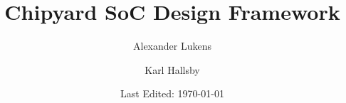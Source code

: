 \documentclass[oneside]{book}
\begin{document}
\begin{titlepage}
  \vspace{1in}
  \title{Chipyard SoC Design Framework}
  \author{Alexander Lukens \and Karl Hallsby}
  \date{Last Edited: \today}
\end{titlepage}
\maketitle
\frontmatter
\tableofcontents

\mainmatter{}



\end{document}
